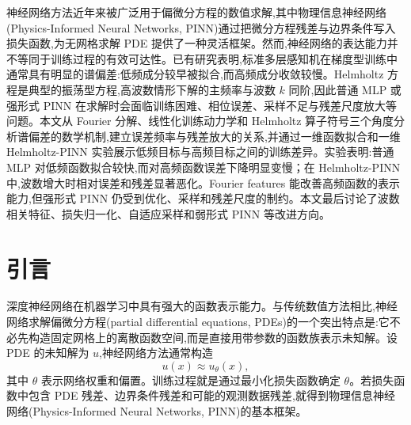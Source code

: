 \documentclass[12pt,hyperref,a4paper,UTF8,twoside]{ctexart}
\begin{document}
\cover%
\thispagestyle{empty}
\newpage
\pagestyle{abstractcnstyle}
\begin{abstractcn}
神经网络方法近年来被广泛用于偏微分方程的数值求解,其中物理信息神经网络(Physics-Informed Neural Networks, PINN)通过把微分方程残差与边界条件写入损失函数,为无网格求解 PDE 提供了一种灵活框架。然而,神经网络的表达能力并不等同于训练过程的有效可达性。已有研究表明,标准多层感知机在梯度型训练中通常具有明显的谱偏差:低频成分较早被拟合,而高频成分收敛较慢。Helmholtz 方程是典型的振荡型方程,高波数情形下解的主频率与波数 $k$ 同阶,因此普通 MLP 或强形式 PINN 在求解时会面临训练困难、相位误差、采样不足与残差尺度放大等问题。本文从 Fourier 分解、线性化训练动力学和 Helmholtz 算子符号三个角度分析谱偏差的数学机制,建立误差频率与残差放大的关系,并通过一维函数拟合和一维 Helmholtz-PINN 实验展示低频目标与高频目标之间的训练差异。实验表明:普通 MLP 对低频函数拟合较快,而对高频函数误差下降明显变慢；在 Helmholtz-PINN 中,波数增大时相对误差和残差显著恶化。Fourier features 能改善高频函数的表示能力,但强形式 PINN 仍受到优化、采样和残差尺度的制约。本文最后讨论了波数相关特征、损失归一化、自适应采样和弱形式 PINN 等改进方向。
\end{abstractcn}


\newpage
\pagestyle{contentstyle}
\tableofcontents

\newpage
\pagestyle{articlestyle} %
\setcounter{page}{1}   %


\section{引言}

深度神经网络在机器学习中具有强大的函数表示能力。与传统数值方法相比,神经网络求解偏微分方程(partial differential equations, PDEs)的一个突出特点是:它不必先构造固定网格上的离散函数空间,而是直接用带参数的函数族表示未知解。设 PDE 的未知解为 $u$,神经网络方法通常构造
\begin{equation}\label{eq:basic-approx}
    u(x)\approx u_\theta(x),
\end{equation}
其中 $\theta$ 表示网络权重和偏置。训练过程就是通过最小化损失函数确定 $\theta$。若损失函数中包含 PDE 残差、边界条件残差和可能的观测数据残差,就得到物理信息神经网络(Physics-Informed Neural Networks, PINN)的基本框架\cite{raissi2019physics}。
\end{document}
